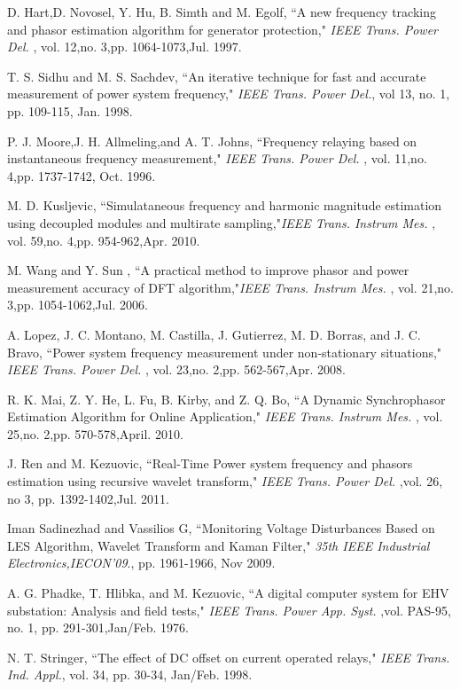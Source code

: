 \documentclass{UCF_ETD}
\begin{document}
\begin{thebibliography}{99}
D. Hart,D. Novosel, Y. Hu, B. Simth and M. Egolf, ``A new frequency tracking and phasor estimation algorithm for generator protection," \emph{IEEE Trans. Power Del.} , vol. 12,no. 3,pp. 1064-1073,Jul. 1997. 

T. S. Sidhu and M. S. Sachdev, ``An iterative technique for fast and accurate measurement of power system frequency," \emph{IEEE Trans. Power  Del.}, vol 13, no. 1, pp. 109-115, Jan. 1998.

P. J. Moore,J. H. Allmeling,and A. T. Johns, ``Frequency relaying based on instantaneous frequency measurement," \emph{IEEE Trans. Power Del.} , vol. 11,no. 4,pp. 1737-1742, Oct. 1996. 

M. D. Kusljevic, ``Simulataneous frequency and harmonic magnitude estimation using decoupled modules and multirate sampling,"\emph{IEEE Trans. Instrum Mes.} , vol. 59,no. 4,pp. 954-962,Apr. 2010.

M. Wang and Y. Sun , ``A practical method to improve phasor and power measurement accuracy of DFT algorithm,"\emph{IEEE Trans. Instrum Mes.} , vol. 21,no. 3,pp. 1054-1062,Jul. 2006.

A. Lopez, J. C. Montano, M. Castilla, J. Gutierrez, M. D. Borras, and J. C. Bravo, ``Power system frequency measurement under non-stationary situations," \emph{IEEE Trans. Power Del.} , vol. 23,no. 2,pp. 562-567,Apr. 2008.

R. K. Mai, Z. Y. He, L. Fu, B. Kirby, and Z. Q. Bo, ``A Dynamic Synchrophasor Estimation
Algorithm for Online Application," \emph{IEEE Trans. Instrum Mes.} , vol. 25,no. 2,pp. 570-578,April. 2010.

J. Ren and M. Kezuovic, ``Real-Time Power system frequency and phasors estimation using recursive wavelet transform," \emph{IEEE Trans. Power Del.} ,vol. 26, no 3, pp. 1392-1402,Jul.  2011.

Iman Sadinezhad and Vassilios G, ``Monitoring Voltage Disturbances Based on LES Algorithm, Wavelet Transform and Kaman Filter," \emph{35th IEEE Industrial Electronics,IECON’09}., pp. 1961-1966, Nov 2009. 

A. G. Phadke, T. Hlibka, and M. Kezuovic, ``A digital computer system for EHV substation: Analysis and field tests," \emph{IEEE Trans. Power App. Syst.} ,vol. PAS-95, no. 1, pp. 291-301,Jan/Feb. 1976.

N. T. Stringer, ``The effect of DC offset on current operated relays," \emph{IEEE Trans. Ind. Appl.}, vol. 34, pp. 30-34, Jan/Feb. 1998.


\end{thebibliography}
\end{document}
